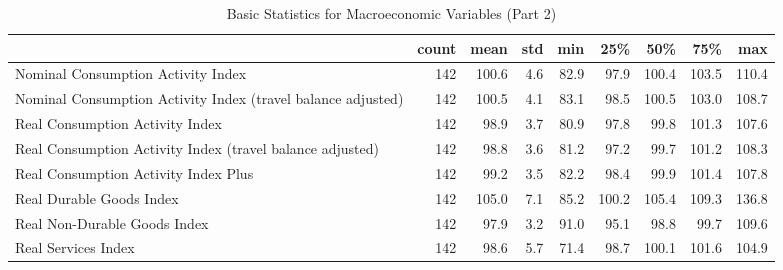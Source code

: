 \documentclass[a4paper,12pt]{article}
\begin{document}
        
        \begin{landscape}
        \begin{table}
\caption{Basic Statistics for Macroeconomic Variables (Part 2)}
\label{tab:statistics_Macroeconomic_Variables_(Part_2)}
\begin{tabular}{lrrrrrrrr}
\toprule
 & count & mean & std & min & 25\% & 50\% & 75\% & max \\
\midrule
Nominal Consumption Activity Index & 142 & 100.6 & 4.6 & 82.9 & 97.9 & 100.4 & 103.5 & 110.4 \\
Nominal Consumption Activity Index (travel balance adjusted) & 142 & 100.5 & 4.1 & 83.1 & 98.5 & 100.5 & 103.0 & 108.7 \\
Real Consumption Activity Index & 142 & 98.9 & 3.7 & 80.9 & 97.8 & 99.8 & 101.3 & 107.6 \\
Real Consumption Activity Index (travel balance adjusted) & 142 & 98.8 & 3.6 & 81.2 & 97.2 & 99.7 & 101.2 & 108.3 \\
Real Consumption Activity Index Plus & 142 & 99.2 & 3.5 & 82.2 & 98.4 & 99.9 & 101.4 & 107.8 \\
Real Durable Goods Index & 142 & 105.0 & 7.1 & 85.2 & 100.2 & 105.4 & 109.3 & 136.8 \\
Real Non-Durable Goods Index & 142 & 97.9 & 3.2 & 91.0 & 95.1 & 98.8 & 99.7 & 109.6 \\
Real Services Index & 142 & 98.6 & 5.7 & 71.4 & 98.7 & 100.1 & 101.6 & 104.9 \\
\bottomrule
\end{tabular}
\end{table}

        \end{landscape}
        
        
\end{document}
